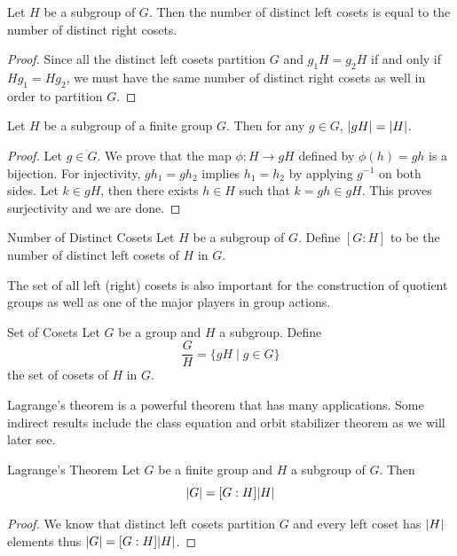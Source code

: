 \documentclass[a4paper]{article}
\begin{document}
\begin{prp}{}{} Let $H$ be a subgroup of $G$. Then the number of distinct left cosets is equal to the number of distinct right cosets. 
\begin{proof} Since all the distinct left cosets partition $G$ and $g_1H=g_2H$ if and only if $Hg_1=Hg_2$, we must have the same number of distinct right cosets as well in order to partition $G$. 
\end{proof}
\end{prp}

\begin{prp}{}{} Let $H$ be a subgroup of a finite group $G$. Then for any $g\in G$, $\abs{gH}=\abs{H}$. 
\begin{proof} Let $g\in G$. We prove that the map $\phi:H\to gH$ defined by $\phi(h)=gh$ is a bijection. For injectivity, $gh_1=gh_2$ implies $h_1=h_2$ by applying $g^{-1}$ on both sides. Let $k\in gH$, then there exists $h\in H$ such that $k=gh\in gH$. This proves surjectivity and we are done. 
\end{proof}
\end{prp}

\begin{defn}{Number of Distinct Cosets}{} Let $H$ be a subgroup of $G$. Define $[G:H]$ to be the number of distinct left cosets of $H$ in $G$. 
\end{defn}

The set of all left (right) cosets is also important for the construction of quotient groups as well as one of the major players in group actions. 

\begin{defn}{Set of Cosets}{} Let $G$ be a group and $H$ a subgroup. Define $$\frac{G}{H}=\{gH\;|\;g\in G\}$$ the set of cosets of $H$ in $G$. 
\end{defn}

Lagrange's theorem is a powerful theorem that has many applications. Some indirect results include the class equation and orbit stabilizer theorem as we will later see. 

\begin{thm}{Lagrange's Theorem}{} Let $G$ be a finite group and $H$ a subgroup of $G$. Then $$\abs{G}=[G:H]\abs{H}$$ 
\begin{proof} We know that distinct left cosets partition $G$ and every left coset has $\abs{H}$ elements thus $\abs{G}=[G:H]\abs{H}$. 
\end{proof}
\end{thm}
\end{document}
